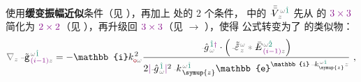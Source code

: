 使用\textbf{\textcolor{NavyBlue}{缓变振幅}近似}条件（见 ），再加上  处的 2 个条件， 中的 $\xint{\mathcolor{gray}{-}}{21}{\bar{\bar{V}}}^{\;\! \mathcolor{gray}{\omega} \textcolor{PineGreen}{\hat{1}}}_{\;\! \mathcolor{gray}{z}}$ 先从  的 $\textcolor{Plum}{3 \times 3}$ 简化为 $\textcolor{Plum}{2 \times 2}$（见 ），再升级回 $\textcolor{Plum}{3 \times 3}$（见  $\to$ ），使得  公式转变为了  的类似物：
\begin{align} \label{eq:Born_approx-scalar-g-modulus}
	\mathcolor{gray}{\nabla_z} \xint{\begin{smallmatrix} ~ \\ {}^{}_{\mathcolor{gray}{-}} \\ ~ \end{smallmatrix}}{09}{\tilde{\mathtt{g}}}^{\;\!\mathcolor{gray}{\omega} \textcolor{PineGreen}{\hat{1}}}_{\;\! \textcolor{Plum}{(i-1)} \mathcolor{gray}{z}} = - \mathbb{i} k_{\textcolor{Maroon}{\mathsf{o}} \mathcolor{gray}{\omega}}^{\;\! 2} \frac{\xint{{}^{}_{\mathcolor{gray}{-}}}{10}{\hat{g}}^{\;\! \textcolor{PineGreen}{\hat{1}} \textcolor{Plum}{\dag}}_{\;\! \mathcolor{gray}{\omega}} \cdot \left( \xint{\begin{smallmatrix} ~ \\ {}^{}_{\mathcolor{gray}{-}} \\ ~ \end{smallmatrix}}{16}{\tilde{\tilde{\varepsilon}}}^{\;\! \mathcolor{gray}{\omega}}_{\;\! \mathcolor{gray}{z}} \mathcolor{gray}{*} \xint{\mathcolor{gray}{-}}{295}{\bar{E}}^{\;\! \mathcolor{gray}{\omega} \textcolor{PineGreen}{\hat{2}}}_{\;\! \textcolor{Plum}{(i-1)} \mathcolor{gray}{z}} \right) }{ 2 \textcolor{Plum}{\lvert} \xint{{}^{}_{\mathcolor{gray}{-}}}{10}{\hat{g}}^{\;\! \textcolor{PineGreen}{\hat{1}}}_{\;\! \mathcolor{gray}{\omega}} \textcolor{Plum}{\rvert}^2 \xint{\begin{smallmatrix} ~ \\ {}^{}_{\mathcolor{gray}{-}} \\ ~ \end{smallmatrix}}{15}{k}_{\;\! \symup{z}}^{\;\! \mathcolor{gray}{\omega} \textcolor{PineGreen}{\hat{1}}} \mathbb{e}^{\mathbb{i} \xint{\begin{smallmatrix} ~ \\ {}^{}_{\mathcolor{gray}{-}} \\ ~ \end{smallmatrix}}{15}{k}_{\symup{z}}^{\;\! \mathcolor{gray}{\omega} \textcolor{PineGreen}{\hat{1}}} \mathcolor{gray}{z}}} ~,
\end{align}
